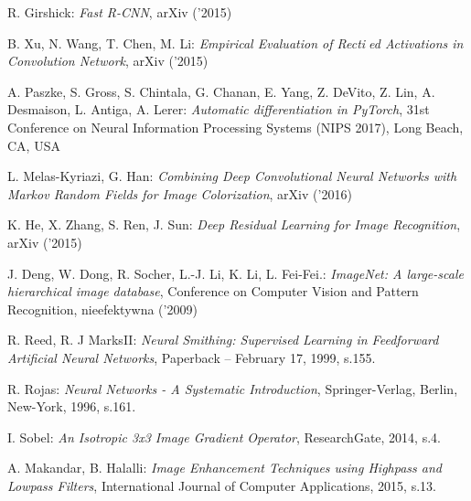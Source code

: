 \begin{thebibliography}{99}
   R. Girshick:
  \emph{Fast R-CNN},
  arXiv ('2015)

   B. Xu, N. Wang, T. Chen, M. Li:
  \emph{Empirical Evaluation of Rectied Activations in Convolution Network},
   arXiv ('2015)

    A. Paszke, S. Gross, S. Chintala, G. Chanan,
   E. Yang, Z. DeVito, Z. Lin, A. Desmaison, L. Antiga, A. Lerer:
   \emph{Automatic differentiation in PyTorch}, 31st Conference on Neural Information
   Processing Systems (NIPS 2017), Long Beach, CA, USA

    L. Melas-Kyriazi, G. Han:
   \emph{Combining Deep Convolutional Neural Networks with Markov Random
   Fields for Image Colorization}, arXiv ('2016)

    K. He, X. Zhang, S. Ren, J. Sun:
   \emph{Deep Residual Learning for Image Recognition}, arXiv ('2015)

   J. Deng, W. Dong, R. Socher, L.-J. Li, K. Li, L. Fei-Fei.:
   \emph{ImageNet: A large-scale hierarchical image database}, Conference on Computer Vision and Pattern Recognition, nieefektywna ('2009)

    R. Reed,  R. J MarksII:
  \emph{Neural Smithing: Supervised Learning in Feedforward Artificial Neural Networks},
  Paperback – February 17, 1999, s.155.

   R. Rojas:
  \emph{Neural Networks - A Systematic Introduction},
  Springer-Verlag, Berlin, New-York, 1996, s.161.

   I. Sobel:
  \emph{An Isotropic 3x3 Image Gradient Operator},
  ResearchGate, 2014, s.4.

   A. Makandar, B. Halalli:
  \emph{Image Enhancement Techniques using Highpass and Lowpass Filters},
  International Journal of Computer Applications, 2015, s.13.

\end{thebibliography}
